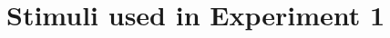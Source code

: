 \documentclass[10pt,letterpaper]{article}
\begin{document}
%	
%	
%	
%	



\appendix
\section{Stimuli used in Experiment 1}
\label{sec:appendix}	
\end{document}
